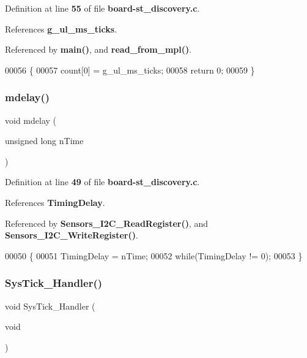 Definition at line \textbf{ 55} of file \textbf{ board-\/st\+\_\+discovery.\+c}.



References \textbf{ g\+\_\+ul\+\_\+ms\+\_\+ticks}.



Referenced by \textbf{ main()}, and \textbf{ read\+\_\+from\+\_\+mpl()}.


\begin{DoxyCode}
00056 \{
00057         count[0] = g_ul_ms_ticks;
00058     \textcolor{keywordflow}{return} 0;
00059 \}
\end{DoxyCode}
\mbox{\label{board-st__discovery_8c_aac3cd1e2cc3631be4fe17ab30f42fcc7}} 
\subsubsection{mdelay()}
{\footnotesize\ttfamily void mdelay (\begin{DoxyParamCaption}\item[{unsigned long}]{n\+Time }\end{DoxyParamCaption})}



Definition at line \textbf{ 49} of file \textbf{ board-\/st\+\_\+discovery.\+c}.



References \textbf{ Timing\+Delay}.



Referenced by \textbf{ Sensors\+\_\+\+I2\+C\+\_\+\+Read\+Register()}, and \textbf{ Sensors\+\_\+\+I2\+C\+\_\+\+Write\+Register()}.


\begin{DoxyCode}
00050 \{
00051     TimingDelay = nTime;
00052     \textcolor{keywordflow}{while}(TimingDelay != 0);
00053 \}
\end{DoxyCode}
\mbox{\label{board-st__discovery_8c_ab5e09814056d617c521549e542639b7e}} 
\subsubsection{Sys\+Tick\+\_\+\+Handler()}
{\footnotesize\ttfamily void Sys\+Tick\+\_\+\+Handler (\begin{DoxyParamCaption}\item[{void}]{ }\end{DoxyParamCaption})}



